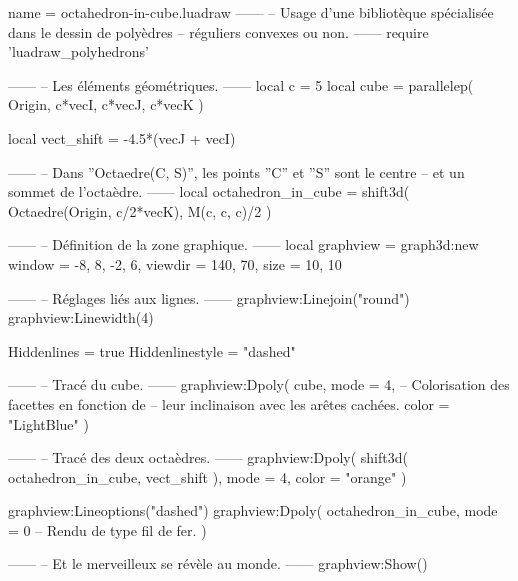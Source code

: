 \documentclass{standalone}
\begin{document}
\begin{luadraw}{name = octahedron-in-cube.luadraw}
------
-- Usage d'une bibliotèque spécialisée dans le dessin de polyèdres
-- réguliers convexes ou non.
------
require 'luadraw_polyhedrons'

------
-- Les éléments géométriques.
------
local c = 5
local cube = parallelep(
  Origin,
  c*vecI, c*vecJ, c*vecK
)

local vect_shift = -4.5*(vecJ + vecI)

------
-- Dans ''Octaedre(C, S)'', les points ''C'' et ''S'' sont le centre
-- et un sommet de l'octaèdre.
------
local octahedron_in_cube = shift3d(
  Octaedre(Origin, c/2*vecK),
  M(c, c, c)/2
)

------
-- Définition de la zone graphique.
------
local graphview = graph3d:new{
  window  = {-8, 8, -2, 6},
  viewdir = {140, 70},
  size    = {10, 10}
}

------
-- Réglages liés aux lignes.
------
graphview:Linejoin("round")
graphview:Linewidth(4)

Hiddenlines     = true
Hiddenlinestyle = "dashed"

------
-- Tracé du cube.
------
graphview:Dpoly(
  cube,
  {
    mode  = 4,  -- Colorisation des facettes en fonction de
                -- leur inclinaison avec les arêtes cachées.
    color = "LightBlue"
  })

------
-- Tracé des deux octaèdres.
------
graphview:Dpoly(
  shift3d(
    octahedron_in_cube,
    vect_shift
  ),
  {
    mode = 4,
    color = "orange"
  })

graphview:Lineoptions("dashed")
graphview:Dpoly(
  octahedron_in_cube,
  {
    mode = 0  -- Rendu de type fil de fer.
  })

------
-- Et le merveilleux se révèle au monde.
------
graphview:Show()
\end{luadraw}
\end{document}
